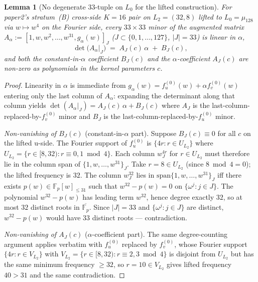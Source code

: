 \documentclass[11pt]{article}
\newtheorem{lemma}[theorem]{Lemma}
\theoremstyle{definition}
\theoremstyle{remark}
\begin{document}
\begin{lemma}[No degenerate $33$-tuple on $L_0$ for the lifted construction]
\label{lem:no-alpha-only-tuple}
For paper2's stratum~(B) cross-side $K = 16$ pair on $L_2 = (32, 8)$ lifted
to $L_0 = \mu_{128}$ via $w \mapsto w^4$ on the Fourier side, every $33 \times 33$
minor of the augmented matrix $A_\alpha := [1, w, w^2, \ldots, w^{31}, g_\alpha(w)]_J$
($J \subset \{0, 1, \ldots, 127\}$, $|J| = 33$) is linear in $\alpha$,
\[
   \det\bigl(A_\alpha\bigr|_J\bigr) \;=\; A_J(c)\, \alpha \;+\; B_J(c),
\]
and \emph{both} the constant-in-$\alpha$ coefficient $B_J(c)$ \emph{and}
the $\alpha$-coefficient $A_J(c)$ are non-zero as polynomials in the
kernel parameters $c$.
\end{lemma}

\begin{proof}
Linearity in $\alpha$ is immediate from $g_\alpha(w) = f_u^{(0)}(w) +
\alpha f_v^{(0)}(w)$ entering only the last column of $A_\alpha$:
expanding the determinant along that column yields
$\det(A_\alpha|_J) = A_J(c)\,\alpha + B_J(c)$ where $A_J$ is the
last-column-replaced-by-$f_v^{(0)}$ minor and $B_J$ is the
last-column-replaced-by-$f_u^{(0)}$ minor.

\emph{Non-vanishing of $B_J(c)$} (constant-in-$\alpha$ part). Suppose
$B_J(c) \equiv 0$ for all $c$ on the lifted u-side. The Fourier
support of $f_u^{(0)}$ is $\{4 r : r \in U_{L_2}\}$ where
$U_{L_2} = \{r \in [8, 32) : r \equiv 0, 1 \bmod 4\}$. Each column
$w^{4r}_J$ for $r \in U_{L_2}$ must therefore lie in the column span
of $\{1, w, \ldots, w^{31}\}_J$. Take $r = 8 \in U_{L_2}$ (since
$8 \bmod 4 = 0$); the lifted frequency is $32$. The column $w^{32}_J$
lies in $\mathrm{span}\{1, w, \ldots, w^{31}\}_J$ iff there exists
$p(w) \in \mathbb{F}_p[w]_{\leq 31}$ such that $w^{32} - p(w) = 0$ on
$\{\omega^j : j \in J\}$. The polynomial $w^{32} - p(w)$ has leading
term $w^{32}$, hence degree exactly $32$, so at most $32$ distinct
roots in $\overline{\mathbb{F}_p}$. Since $|J| = 33$ and
$\{\omega^j : j \in J\}$ are distinct, $w^{32} - p(w)$ would have
$33$ distinct roots --- contradiction.

\emph{Non-vanishing of $A_J(c)$} ($\alpha$-coefficient part). The same
degree-counting argument applies verbatim with $f_u^{(0)}$ replaced by
$f_v^{(0)}$, whose Fourier support $\{4 r : r \in V_{L_2}\}$ with
$V_{L_2} = \{r \in [8, 32) : r \equiv 2, 3 \bmod 4\}$ is disjoint from
$U_{L_2}$ but has the same minimum frequency $\geq 32$, so $r = 10 \in
V_{L_2}$ gives lifted frequency $40 > 31$ and the same contradiction.
\end{proof}
\end{document}
